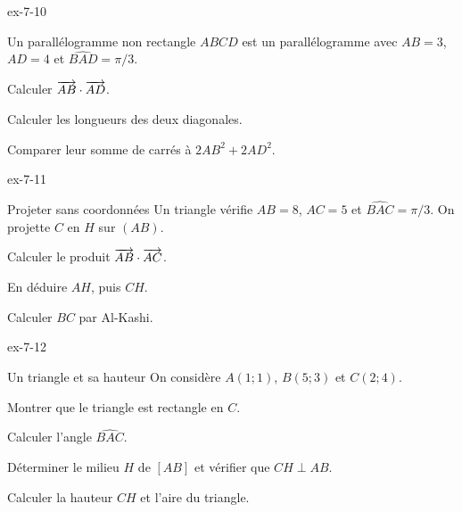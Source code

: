 \begin{blocLivre}{ex-7-10}
\begin{exercice}[2]{Un parallélogramme non rectangle}
$ABCD$ est un parallélogramme avec $AB=3$, $AD=4$ et $\widehat{BAD}=\pi/3$.\begin{questions}
\item Calculer $\overrightarrow{AB}\cdot\overrightarrow{AD}$.
\item Calculer les longueurs des deux diagonales.
\item Comparer leur somme de carrés à $2AB^2+2AD^2$.
\end{questions}

\label{figgeo-07-10-ex}
\end{exercice}
\end{blocLivre}
\begin{blocLivre}{ex-7-11}
\begin{exercice}[2]{Projeter sans coordonnées}
Un triangle vérifie $AB=8$, $AC=5$ et $\widehat{BAC}=\pi/3$. On projette $C$ en $H$ sur $(AB)$.\begin{questions}
\item Calculer le produit $\overrightarrow{AB}\cdot\overrightarrow{AC}$.
\item En déduire $AH$, puis $CH$.
\item Calculer $BC$ par Al-Kashi.
\end{questions}

\label{figgeo-07-11-ex}
\end{exercice}
\end{blocLivre}
\clearpage
{}
\begin{blocLivre}{ex-7-12}
\begin{exercice}[3]{Un triangle et sa hauteur}
On considère $A(1;1)$, $B(5;3)$ et $C(2;4)$.\begin{questions}
\item Montrer que le triangle est rectangle en $C$.
\item Calculer l’angle $\widehat{BAC}$.
\item Déterminer le milieu $H$ de $[AB]$ et vérifier que $CH\perp AB$.
\item Calculer la hauteur $CH$ et l’aire du triangle.
\end{questions}

\label{figgeo-07-12-ex}
\end{exercice}
\end{blocLivre}
